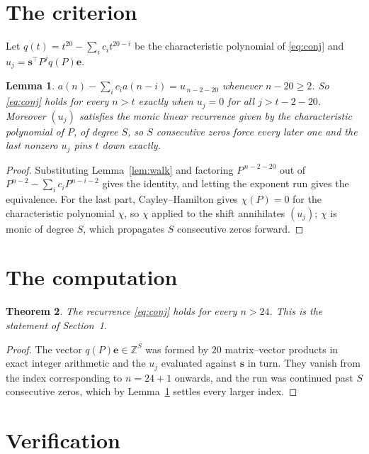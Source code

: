 \documentclass[11pt,a4paper]{article}
\theoremstyle{plain}
\newtheorem{theorem}{Theorem}
\newtheorem{lemma}[theorem]{Lemma}
\theoremstyle{definition}
\begin{document}
\section{The criterion}

Let $q(t)=t^{20}-\sum_i c_i t^{20-i}$ be the characteristic polynomial of
\eqref{eq:conj} and $u_j=\mathbf{s}^{\!\top}P^{j}q(P)\mathbf{e}$.

\begin{lemma}\label{lem:crit}
$a(n)-\sum_i c_i a(n-i)=u_{\,n-2-20}$ whenever $n-20\ge2$. So \eqref{eq:conj}
holds for every $n>t$ exactly when $u_j=0$ for all $j>t-2-20$. Moreover $(u_j)$
satisfies the monic linear recurrence given by the characteristic polynomial of $P$, of
degree $S$, so $S$ consecutive zeros force every later one and the last nonzero $u_j$ pins
$t$ down exactly.
\end{lemma}

\begin{proof}
Substituting Lemma~\ref{lem:walk} and factoring $P^{\,n-2-20}$ out of
$P^{n-2}-\sum_i c_i P^{n-i-2}$ gives the identity, and letting the exponent run gives the
equivalence. For the last part, Cayley--Hamilton gives $\chi(P)=0$ for the characteristic
polynomial $\chi$, so $\chi$ applied to the shift annihilates $(u_j)$; $\chi$ is monic of
degree $S$, which propagates $S$ consecutive zeros forward.
\end{proof}

\section{The computation}

\begin{theorem}
The recurrence \eqref{eq:conj} holds for every $n>24$. This is the statement of
Section~1.
\end{theorem}

\begin{proof}
The vector $q(P)\mathbf{e}\in\mathbb{Z}^{S}$ was formed by $20$ matrix--vector
products in exact integer arithmetic and the $u_j$ evaluated against $\mathbf{s}$ in turn.
They vanish from the index corresponding to $n=24+1$ onwards, and the run was continued
past $S$ consecutive zeros, which by Lemma~\ref{lem:crit} settles every larger index.
\end{proof}

\section{Verification}
\end{document}
